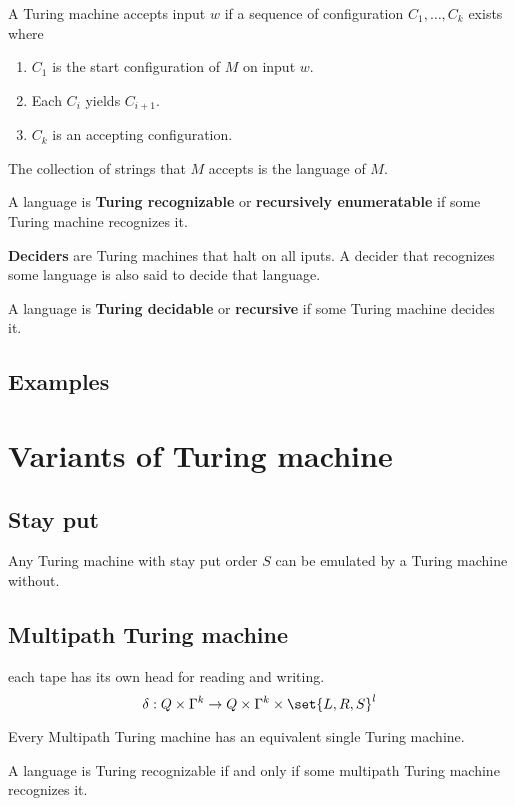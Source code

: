 A Turing machine accepts input \(w\) if a sequence of configuration \(C_1, \dots , C_k\) exists where 
\begin{enumerate}
    \item \(C_1\) is the start configuration of \(M\) on input \(w\).
    \item Each \(C_i\) yields \(C_{i + 1}\).
    \item \(C_k\) is an accepting configuration.
\end{enumerate}
The collection of strings that \(M\) accepts is the language of \(M\).
\begin{definition}
    A language is \textbf{Turing recognizable} or \textbf{recursively enumeratable} if some Turing machine recognizes it.

    \textbf{Deciders} are Turing machines that halt on all iputs. A decider that recognizes some language is also said to decide that language.

    A language is \textbf{Turing decidable} or \textbf{recursive} if some Turing machine decides it. 
\end{definition}
\subsection{Examples}
\section{Variants of Turing machine}
\subsection{Stay put}
Any Turing machine with stay put order \(S\) can be emulated by a Turing machine without.
\subsection{Multipath Turing machine}
each tape has its own head for reading and writing. 
\begin{equation*}
    \delta: Q \times \Gamma^k \to  Q \times \Gamma^k \times \set{L,R,S}^l
\end{equation*}
\begin{theorem}
    Every Multipath Turing machine has an equivalent single Turing machine.
\end{theorem}
\begin{corollary}
    A language is Turing recognizable if and only if some multipath Turing machine recognizes it. 
\end{corollary}

